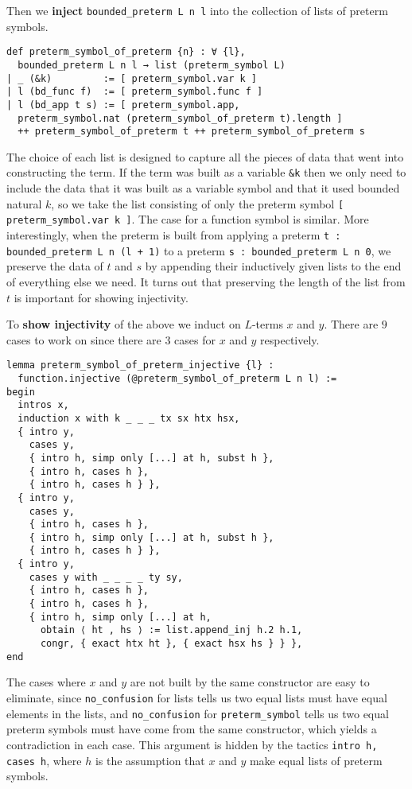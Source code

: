 Then we \textbf{inject} \texttt{bounded\_preterm L n l}
into the collection of lists of preterm symbols.

\begin{lstlisting}
def preterm_symbol_of_preterm {n} : ∀ {l},
  bounded_preterm L n l → list (preterm_symbol L)
| _ (&k)         := [ preterm_symbol.var k ]
| l (bd_func f)  := [ preterm_symbol.func f ]
| l (bd_app t s) := [ preterm_symbol.app,
  preterm_symbol.nat (preterm_symbol_of_preterm t).length ]
  ++ preterm_symbol_of_preterm t ++ preterm_symbol_of_preterm s
 \end{lstlisting}

The choice of each list is designed to capture all
the pieces of data that went into constructing the term.
If the term was built as a variable \texttt{\&k}
then we only need to include the data that
it was built as a variable symbol and that it used bounded natural $k$,
so we take the list consisting of only
the preterm symbol \texttt{[ preterm\_symbol.var k ]}.
The case for a function symbol is similar.
More interestingly, when the preterm is built from
applying a preterm \texttt{t : bounded\_preterm L n (l + 1)}
to a preterm \texttt{s : bounded\_preterm L n 0},
we preserve the data of $t$ and $s$ by appending their
inductively given lists to the end of everything else we need.
It turns out that preserving the length of the list from $t$
is important for showing injectivity.

To \textbf{show injectivity} of the above we induct on $L$-terms $x$ and $y$.
There are $9$ cases to work on since there are $3$ cases for $x$ and $y$
respectively.

\begin{lstlisting}
lemma preterm_symbol_of_preterm_injective {l} :
  function.injective (@preterm_symbol_of_preterm L n l) :=
begin
  intros x,
  induction x with k _ _ _ tx sx htx hsx,
  { intro y,
    cases y,
    { intro h, simp only [...] at h, subst h },
    { intro h, cases h },
    { intro h, cases h } },
  { intro y,
    cases y,
    { intro h, cases h },
    { intro h, simp only [...] at h, subst h },
    { intro h, cases h } },
  { intro y,
    cases y with _ _ _ _ ty sy,
    { intro h, cases h },
    { intro h, cases h },
    { intro h, simp only [...] at h,
      obtain ⟨ ht , hs ⟩ := list.append_inj h.2 h.1,
      congr, { exact htx ht }, { exact hsx hs } } },
end \end{lstlisting}

The cases where $x$ and $y$ are not built by the same constructor
are easy to eliminate, since \texttt{no\_confusion}
for lists tells us two equal lists must have equal elements in the lists,
and \texttt{no\_confusion} for \texttt{preterm\_symbol} tells us
two equal preterm symbols must have come from the same constructor,
which yields a contradiction in each case.
This argument is hidden by the tactics \texttt{intro h, cases h},
where $h$ is the assumption that $x$ and $y$
make equal lists of preterm symbols.

